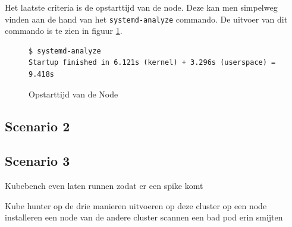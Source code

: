 Het laatste criteria is de opstarttijd van de node. Deze kan men simpelweg vinden aan de hand van het \verb|systemd-analyze| commando. De uitvoer van dit commando is te zien in figuur \ref{SC1_StartTime}.

\begin{figure}
	\centering
	\begin{verbatim} 
$ systemd-analyze
Startup finished in 6.121s (kernel) + 3.296s (userspace) = 9.418s
	\end{verbatim}
	\caption{Opstarttijd van de Node}
	\label{SC1_StartTime}
\end{figure}



\subsection{Scenario 2}

\subsection{Scenario 3}
Kubebench even laten runnen zodat er een spike komt

Kube hunter op de drie manieren uitvoeren op deze cluster 
	op een node installeren
	een node van de andere cluster scannen
	een bad pod erin smijten